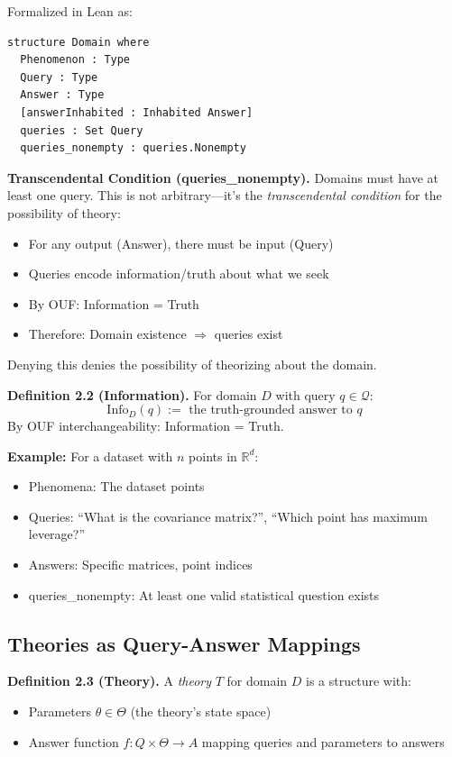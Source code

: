 Formalized in Lean as:
\begin{lstlisting}[language=lean]
structure Domain where
  Phenomenon : Type
  Query : Type
  Answer : Type
  [answerInhabited : Inhabited Answer]
  queries : Set Query
  queries_nonempty : queries.Nonempty
\end{lstlisting}

\textbf{Transcendental Condition (queries\_nonempty).} Domains must have at least one query. This is not arbitrary---it's the \emph{transcendental condition} for the possibility of theory:
\begin{itemize}
\item For any output (Answer), there must be input (Query)
\item Queries encode information/truth about what we seek
\item By OUF: Information = Truth
\item Therefore: Domain existence $\Rightarrow$ queries exist
\end{itemize}

Denying this denies the possibility of theorizing about the domain.

\textbf{Definition 2.2 (Information).} For domain $D$ with query $q \in \mathcal{Q}$:
$$\text{Info}_D(q) := \text{ the truth-grounded answer to } q$$
By OUF interchangeability: Information = Truth.

\textbf{Example:} For a dataset with $n$ points in $\mathbb{R}^d$:
\begin{itemize}
\item Phenomena: The dataset points
\item Queries: ``What is the covariance matrix?'', ``Which point has maximum leverage?''
\item Answers: Specific matrices, point indices
\item queries\_nonempty: At least one valid statistical question exists
\end{itemize}

\subsection{Theories as Query-Answer Mappings}\label{theories-as-query-answer-mappings}

\textbf{Definition 2.3 (Theory).} A \emph{theory} $T$ for domain $D$ is a structure with:
\begin{itemize}
\item Parameters $\theta \in \Theta$ (the theory's state space)
\item Answer function $f : Q \times \Theta \to A$ mapping queries and parameters to answers
\end{itemize}

